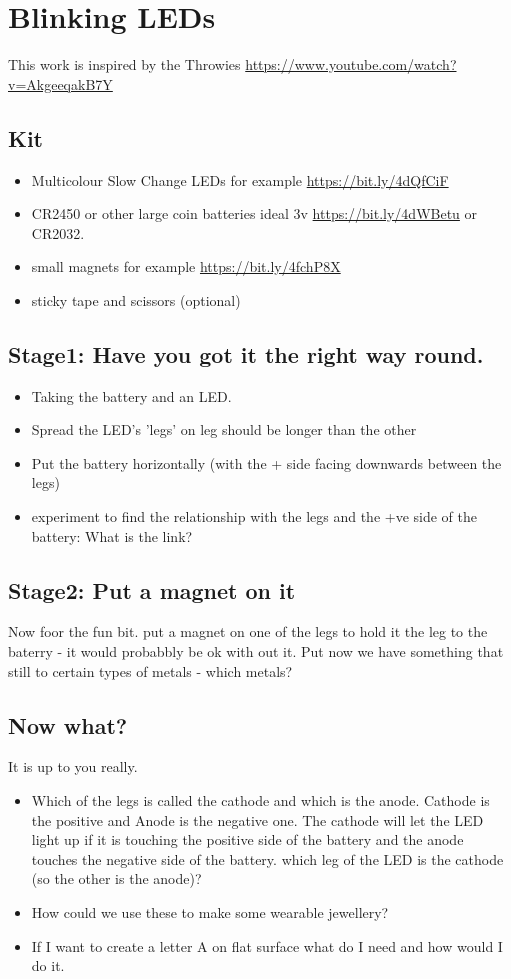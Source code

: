 \chapter{Blinking LEDs}
This work is inspired by the Throwies \url{https://www.youtube.com/watch?v=AkgeeqakB7Y}

\section{Kit}
\begin{itemize}
    \item Multicolour Slow Change LEDs for example \url{https://bit.ly/4dQfCiF}
    \item CR2450 or other large coin batteries ideal 3v \url{https://bit.ly/4dWBetu} or CR2032.
    \item small magnets for example \url{https://bit.ly/4fchP8X}
    \item sticky tape and scissors (optional)
\end{itemize}
\section{Stage1: Have you got it the right way round.}
\begin{itemize}
    \item Taking the battery and an LED. 
    \item Spread the LED's 'legs' on leg should be longer than the other
    \item Put the battery horizontally (with the + side facing downwards between the legs)
    \item experiment to find the relationship with the legs and the +ve side of the battery: What is the link?
\end{itemize}

\section{Stage2: Put a magnet on it}
Now foor the fun bit. put a magnet on one of the legs to hold it the leg to the baterry - it would probabbly be ok with out it. Put now we have something that still to certain types of metals - which metals?

\section{Now what?}
It is up to you really.
\begin{itemize}
    \item Which of the legs is called the cathode and which is the anode. Cathode is the positive and Anode is the negative one. The cathode will let the LED light up if it is touching the positive side of the battery and the anode touches the negative side of the battery. which leg of the LED is the cathode (so the other is the anode)?
    \item How could we use these to make some wearable jewellery?
    \item If I want to create a letter A on flat surface what do I need and how would I do it.
\end{itemize}





